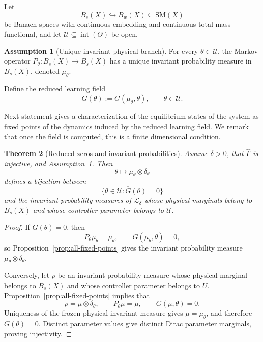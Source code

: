 \documentclass[11pt]{article}
\newtheorem{theorem}{Theorem}[section]
\theoremstyle{definition}
\newtheorem{assumption}[theorem]{Assumption}
\theoremstyle{remark}
\newcommand{\SM}{\mathrm{SM}}
\newcommand{\STO}{\mathcal{L}}
\newcommand{\ThetaSet}{\Theta}
\newcommand{\Gammahat}{\widehat{\Gamma}}
\begin{document}
Let
\[
  B_s(X)\hookrightarrow B_w(X)\subseteq\SM(X)
\]
be Banach spaces with continuous embedding and continuous total-mass
functional, and let
\(\mathcal U\subseteq\operatorname{int}(\ThetaSet)\) be open.

\begin{assumption}[Unique invariant physical branch]
\label{ass:physical-branch}
For every \(\theta\in\mathcal U\), the Markov operator \(P_\theta:B_s(X) \to B_s(X) \) has a
unique invariant probability measure in \(B_s(X)\),  
denoted
\(\mu_\theta\). 
\end{assumption}

Define the reduced learning field
\begin{equation}
  \overline G(\theta):=G(\mu_\theta,\theta),
  \qquad \theta\in\mathcal U.
  \label{eq:effective-gradient}
\end{equation}

 Next statement gives a characterization of the equilibrium states of the system as fixed  points of the dynamics induced by the reduced learning field. We remark that once the field is computed, this is a finite dimensional condition.

\begin{theorem}[Reduced zeros and invariant probabilities]
\label{thm:equilibrium-correspondence}
Assume \(\delta>0\), that \(\Gammahat\) is injective, and
Assumption~\ref{ass:physical-branch}.  Then
\begin{equation}
  \theta\longmapsto\mu_\theta\otimes\delta_\theta
  \label{eq:equilibrium-correspondence-map}
\end{equation}
defines a bijection between
\[
  \{\theta\in\mathcal U:\overline G(\theta)=0\}
\]
and the invariant probability measures of \(\STO_\delta\) whose physical marginals belong to \(B_s(X)\) and whose controller
parameter belongs to \(\mathcal U\).
\end{theorem}

\begin{proof}
If \(\overline G(\theta)=0\), then
\[
  P_\theta\mu_\theta=\mu_\theta,
  \qquad
  G(\mu_\theta,\theta)=0,
\]
so Proposition~\ref{prop:all-fixed-points} gives the invariant probability
measure \(\mu_\theta\otimes\delta_\theta\).

Conversely, let $\rho$ be an invariant probability measure
whose physical marginal belongs to $B_s(X)$ and whose
controller parameter belongs to $U$.
  Proposition~\ref{prop:all-fixed-points}
implies that
\[
  \rho=\mu\otimes\delta_\theta,
  \qquad
  P_\theta\mu=\mu,
  \qquad
  G(\mu,\theta)=0.
\]
Uniqueness of the frozen physical invariant measure gives
\(\mu=\mu_\theta\), and therefore \(\overline G(\theta)=0\).  Distinct
parameter values give distinct Dirac parameter marginals, proving injectivity.
\end{proof}
\end{document}
